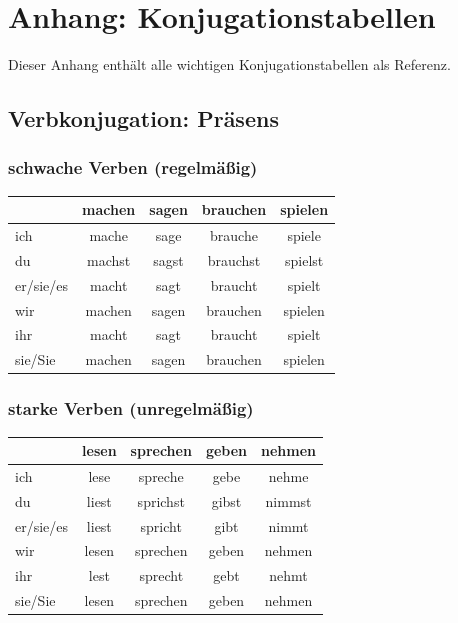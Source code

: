 \chapter{Anhang: Konjugationstabellen}
\label{cha:Anhang}

Dieser Anhang enthält alle wichtigen Konjugationstabellen als Referenz.

\section{Verbkonjugation: Präsens}
\label{sec:KonjugationPraesens}

\subsection{schwache Verben (regelmäßig)}
\label{sec:SchwacheVerben}

\begin{center}
\begin{tabular}{|l|c|c|c|c|}
\hline
\textbf{} & \textbf{machen} & \textbf{sagen} & \textbf{brauchen} & \textbf{spielen} \\ \hline
ich & mache & sage & brauche & spiele \\ \hline
du & machst & sagst & brauchst & spielst \\ \hline
er/sie/es & macht & sagt & braucht & spielt \\ \hline
wir & machen & sagen & brauchen & spielen \\ \hline
ihr & macht & sagt & braucht & spielt \\ \hline
sie/Sie & machen & sagen & brauchen & spielen \\ \hline
\end{tabular}
\end{center}

\subsection{starke Verben (unregelmäßig)}
\label{sec:StarkeVerben}

\begin{center}
\begin{tabular}{|l|c|c|c|c|}
\hline
\textbf{} & \textbf{lesen} & \textbf{sprechen} & \textbf{geben} & \textbf{nehmen} \\ \hline
ich & lese & spreche & gebe & nehme \\ \hline
du & liest & sprichst & gibst & nimmst \\ \hline
er/sie/es & liest & spricht & gibt & nimmt \\ \hline
wir & lesen & sprechen & geben & nehmen \\ \hline
ihr & lest & sprecht & gebt & nehmt \\ \hline
sie/Sie & lesen & sprechen & geben & nehmen \\ \hline
\end{tabular}
\end{center}

